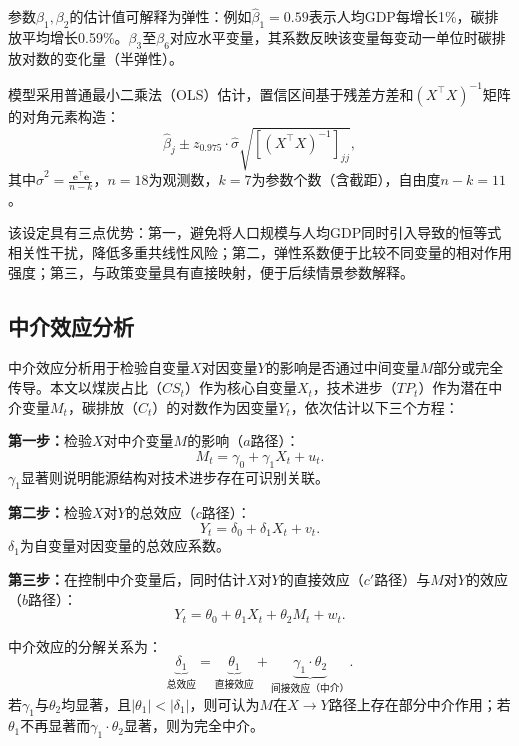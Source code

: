 参数$\beta_1,\beta_2$的估计值可解释为弹性：例如$\hat\beta_1=0.59$表示人均GDP每增长1\%，碳排放平均增长0.59\%。$\beta_3$至$\beta_6$对应水平变量，其系数反映该变量每变动一单位时碳排放对数的变化量（半弹性）。

模型采用普通最小二乘法（OLS）估计，置信区间基于残差方差和$(X^\top X)^{-1}$矩阵的对角元素构造：
\begin{equation}
\hat\beta_j \pm z_{0.975}\cdot\hat{\sigma}\sqrt{[(X^\top X)^{-1}]_{jj}},
\end{equation}
其中$\hat\sigma^2 = \frac{\mathbf{e}^\top\mathbf{e}}{n-k}$，$n=18$为观测数，$k=7$为参数个数（含截距），自由度$n-k=11$。

该设定具有三点优势：第一，避免将人口规模与人均GDP同时引入导致的恒等式相关性干扰，降低多重共线性风险；第二，弹性系数便于比较不同变量的相对作用强度；第三，与政策变量具有直接映射，便于后续情景参数解释。

\subsection{中介效应分析}
中介效应分析用于检验自变量$X$对因变量$Y$的影响是否通过中间变量$M$部分或完全传导。本文以煤炭占比（$CS_t$）作为核心自变量$X_t$，技术进步（$TP_t$）作为潜在中介变量$M_t$，碳排放（$C_t$）的对数作为因变量$Y_t$，依次估计以下三个方程：

{\songti\bfseries{}第一步：}检验$X$对中介变量$M$的影响（$a$路径）：
\begin{equation}
M_t = \gamma_0 + \gamma_1 X_t + u_t.
\end{equation}
$\gamma_1$显著则说明能源结构对技术进步存在可识别关联。

{\songti\bfseries{}第二步：}检验$X$对$Y$的总效应（$c$路径）：
\begin{equation}
Y_t = \delta_0 + \delta_1 X_t + v_t.
\end{equation}
$\delta_1$为自变量对因变量的总效应系数。

{\songti\bfseries{}第三步：}在控制中介变量后，同时估计$X$对$Y$的直接效应（$c'$路径）与$M$对$Y$的效应（$b$路径）：
\begin{equation}
Y_t = \theta_0 + \theta_1 X_t + \theta_2 M_t + w_t.
\end{equation}

中介效应的分解关系为：
\begin{equation}
\underbrace{\delta_1}_{\text{总效应}} = \underbrace{\theta_1}_{\text{直接效应}} + \underbrace{\gamma_1 \cdot \theta_2}_{\text{间接效应（中介）}}.
\end{equation}
若$\gamma_1$与$\theta_2$均显著，且$|\theta_1| < |\delta_1|$，则可认为$M$在$X\to Y$路径上存在部分中介作用；若$\theta_1$不再显著而$\gamma_1\cdot\theta_2$显著，则为完全中介。

